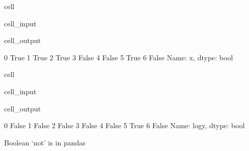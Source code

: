 \documentclass[letterpaper,10pt,english]{jupyterBook}
\begin{document}
\begin{sphinxuseclass}{cell}\begin{sphinxVerbatimInput}

\begin{sphinxuseclass}{cell_input}
\begin{sphinxVerbatim}[commandchars=\\\{\}]
\PYG{p}{[}\PYG{p}{]}
\end{sphinxVerbatim}

\end{sphinxuseclass}\end{sphinxVerbatimInput}
\begin{sphinxVerbatimOutput}

\begin{sphinxuseclass}{cell_output}
\begin{sphinxVerbatim}[commandchars=\\\{\}]
0     True
1     True
2     True
3    False
4    False
5     True
6    False
Name: x, dtype: bool
\end{sphinxVerbatim}

\end{sphinxuseclass}\end{sphinxVerbatimOutput}

\end{sphinxuseclass}
\begin{sphinxuseclass}{cell}\begin{sphinxVerbatimInput}

\begin{sphinxuseclass}{cell_input}
\begin{sphinxVerbatim}[commandchars=\\\{\}]
\PYG{p}{[}\PYG{p}{]}
\end{sphinxVerbatim}

\end{sphinxuseclass}\end{sphinxVerbatimInput}
\begin{sphinxVerbatimOutput}

\begin{sphinxuseclass}{cell_output}
\begin{sphinxVerbatim}[commandchars=\\\{\}]
0    False
1    False
2    False
3    False
4    False
5     True
6    False
Name: log\PYGZus{}y, dtype: bool
\end{sphinxVerbatim}

\end{sphinxuseclass}\end{sphinxVerbatimOutput}

\end{sphinxuseclass}
\sphinxAtStartPar
Boolean ‘not’ is \sphinxcode{\sphinxupquote{\textasciitilde{}}} in pandas
\end{document}

